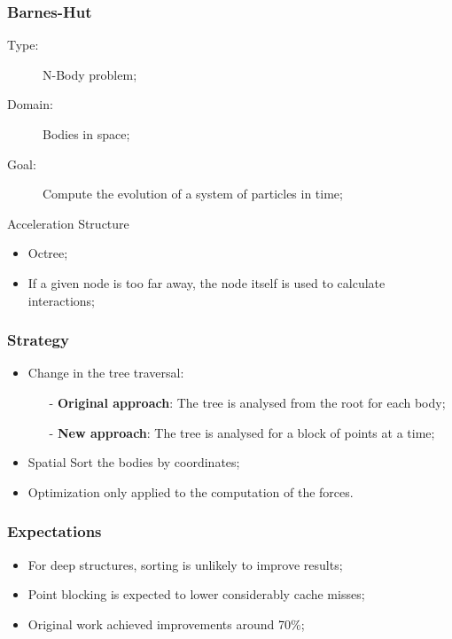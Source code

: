 \begin{frame}
	\frametitle{Barnes-Hut}
	\vfill
	\begin{description}
		\item[Type:] N-Body problem;
		\item[Domain:] Bodies in space;
		\item[Goal:] Compute the evolution of a system of particles in time;
	\end{description}
	\vfill
	\begin{block}{Acceleration Structure}
		\begin{itemize}
			\item Octree;
			\item If a given node is too far away, the node itself is used to calculate interactions;
		\end{itemize}
	\end{block}
	\vfill
\end{frame}

\begin{frame}
	\frametitle{Strategy}
	\begin{itemize}\itemsep=20pt
		\item Change in the tree traversal:
		\begin{itemize}
			\item[-] \textbf{Original approach}: The tree is analysed from the root for each body;
			\item[-] \textbf{New approach}: The tree is analysed for a block of points at a time;
		\end{itemize}
		\item Spatial Sort the bodies by coordinates;
		\item Optimization only applied to the computation of the forces.
	\end{itemize}
\end{frame}

\begin{frame}
	\frametitle{Expectations}
	\begin{itemize}\itemsep=20pt
		\item For deep structures, sorting is unlikely to improve results;
		\item Point blocking is expected to lower considerably cache misses;
		\item Original work achieved improvements around 70\%;
	\end{itemize}
\end{frame}
